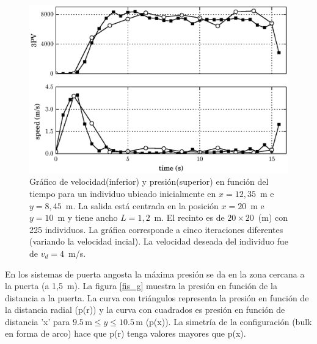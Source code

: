 \begin{figure}[H]
    \centering
    \includegraphics[scale=0.8]{figuras/pv_vel_t_100_1_2.eps}
    \caption[width=5cm]{Gráfico de velocidad(inferior) y presión(superior) en función del tiempo para un individuo ubicado inicialmente en $x=12,35$~m e $y=8,45$~m.  La salida está centrada en la posición $x=20$~m e $y=10$~m y tiene ancho $L=1,2$~m. El recinto es de $20\times 20$~(m) con 225 individuos. La gráfica corresponde a cinco iteraciones diferentes (variando la velocidad incial). La velocidad deseada del individuo fue de $v_d=4$~m/s.}
    \label{pv_vel_t_100_1_2}
\end{figure}

En los sistemas de puerta angosta la máxima presión se da en la zona cercana a la puerta (a 1,5~m). La figura \ref{fis_g} muestra la presión en función de la distancia a la puerta. La curva con triángulos representa la presión en función de la distancia radial (p(r)) y la curva con cuadrados es presión en función de distancia 'x' para $9.5\,\mathrm{m}\leq y\leq 10.5\,\mathrm{m}$ (p(x)). La simetría de la configuración (bulk en forma de arco) hace que p(r) tenga valores mayores que p(x). 

